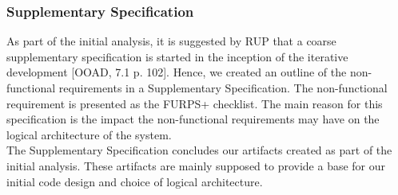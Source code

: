 \subsubsection{Supplementary Specification}
As part of the initial analysis, it is suggested by RUP that a coarse supplementary specification is started in the inception of the iterative development [OOAD, 7.1 p. 102]. Hence, we created an outline of the non-functional requirements in a Supplementary Specification. The non-functional requirement is presented as the FURPS+ checklist. The main reason for this specification is the impact the non-functional requirements may have on the logical architecture of the system.\\
\newline
The Supplementary Specification concludes our artifacts created as part of the initial analysis. These artifacts are mainly supposed to provide a base for our initial code design and choice of logical architecture.\\